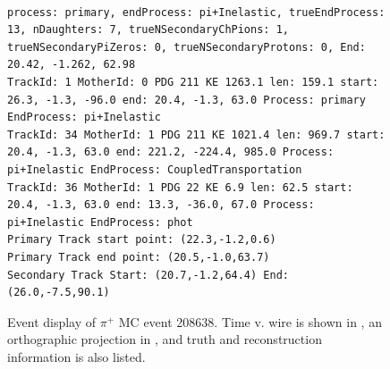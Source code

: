 \documentclass[letterpaper,12pt]{article}
\newcommand{\pip}{\ensuremath{\pi^{+}}}
\begin{document}
\begin{figure}[!hbtp]
\begin{center}
{    }
\\
\begin{lstlisting}
process: primary, endProcess: pi+Inelastic, trueEndProcess: 13, nDaughters: 7, trueNSecondaryChPions: 1, trueNSecondaryPiZeros: 0, trueNSecondaryProtons: 0, End: 20.42, -1.262, 62.98
TrackId: 1 MotherId: 0 PDG 211 KE 1263.1 len: 159.1 start: 26.3, -1.3, -96.0 end: 20.4, -1.3, 63.0 Process: primary EndProcess: pi+Inelastic
TrackId: 34 MotherId: 1 PDG 211 KE 1021.4 len: 969.7 start: 20.4, -1.3, 63.0 end: 221.2, -224.4, 985.0 Process: pi+Inelastic EndProcess: CoupledTransportation
TrackId: 36 MotherId: 1 PDG 22 KE 6.9 len: 62.5 start: 20.4, -1.3, 63.0 end: 13.3, -36.0, 67.0 Process: pi+Inelastic EndProcess: phot
Primary Track start point: (22.3,-1.2,0.6)
Primary Track end point: (20.5,-1.0,63.7)
Secondary Track Start: (20.7,-1.2,64.4) End: (26.0,-7.5,90.1)
\end{lstlisting}
    \caption{%
                Event display of \pip{} MC event 208638. 
                Time v. wire is shown in , 
                an orthographic projection in ,
                and truth and reconstruction information is also listed.
            }
    \label{fig:evd_pipMC_208638}
  \end{center}
\end{figure}
\end{document}
